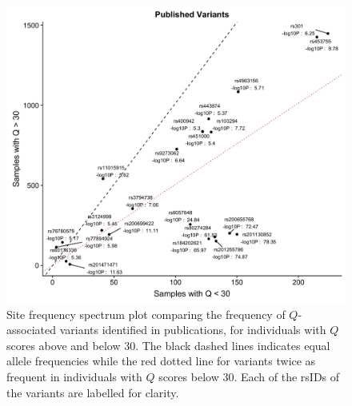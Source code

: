 \documentclass[9pt,lineno]{template}
\begin{document}
\begin{figure}[h]
\centering
\includegraphics[width=15cm,keepaspectratio]{../Figures/Published_OverUnder30.jpg}
\caption{Site frequency spectrum plot comparing the frequency of $Q$-associated variants identified in publications, for individuals with $Q$ scores above and below 30. The black dashed lines indicates equal allele frequencies while the red dotted line for variants twice as frequent in individuals with $Q$ scores below 30. Each of the rsIDs of the variants are labelled for clarity.}  
\label{Pub_30}
\end{figure}
\end{document}
